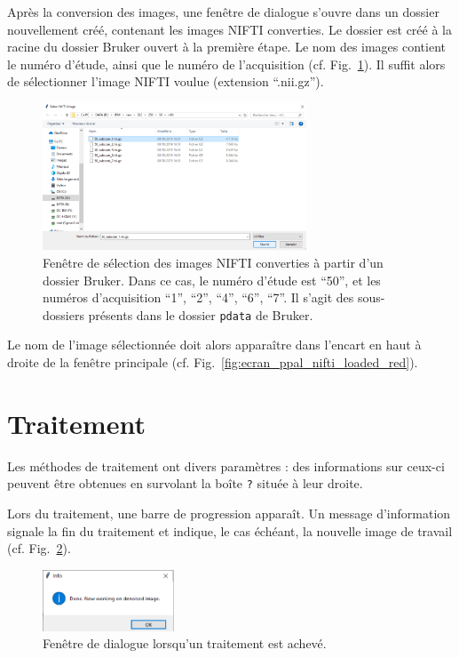 \documentclass[french]{article}
\begin{document}
Après la conversion des images, une fenêtre de dialogue s'ouvre dans
un dossier nouvellement créé, contenant les images NIFTI converties.
Le dossier est créé à la racine du dossier Bruker ouvert à la première
étape. Le nom des images contient le numéro d'étude, ainsi que le
numéro de l'acquisition (cf. Fig.~\ref{fig:open_bruker_nii}). Il
suffit alors de sélectionner l'image NIFTI voulue (extension
``.nii.gz'').

\begin{figure}[ht]
  \centering
  \includegraphics[width=0.7\textwidth]{fig/open_bruker_nii}
  \caption{Fenêtre de sélection des images NIFTI converties à partir
    d'un dossier Bruker. Dans ce cas, le numéro d'étude est ``50'', et
    les numéros d'acquisition ``1'', ``2'', ``4'', ``6'', ``7''. Il
    s'agit des sous-dossiers présents dans le dossier \texttt{pdata} de
    Bruker.}
  \label{fig:open_bruker_nii}
\end{figure}

Le nom de l'image sélectionnée doit alors apparaître dans l'encart en
haut à droite de la fenêtre principale (cf. Fig.~\ref{fig:ecran_ppal_nifti_loaded_red}).

\section{Traitement}
Les méthodes de traitement ont divers paramètres : des informations
sur ceux-ci peuvent être obtenues en survolant la boîte \texttt{?} située à
leur droite.

Lors du traitement, une barre de progression apparaît. Un message
d'information signale la fin du traitement et indique, le cas échéant,
la nouvelle image de travail (cf. Fig.~\ref{fig:denoising_nlmeans4}).

\begin{figure}[ht]
  \centering
  \includegraphics[width=0.35\textwidth]{fig/denoising_nlmeans4}
  \caption{Fenêtre de dialogue lorsqu'un traitement est achevé.}
  \label{fig:denoising_nlmeans4}
\end{figure}
\end{document}
